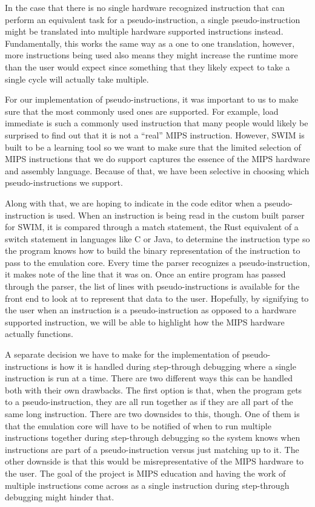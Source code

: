 \documentclass[parskip=half, fontsize=12pt]{scrartcl}
\begin{document}
In the case that there is no single hardware recognized instruction that
can perform an equivalent task for a pseudo-instruction, a single
pseudo-instruction might be translated into multiple hardware supported
instructions instead. Fundamentally, this works the same way as a one to
one translation, however, more instructions being used also means they
might increase the runtime more than the user would expect since
something that they likely expect to take a single cycle will actually
take multiple.

For our implementation of pseudo-instructions, it was important to us to
make sure that the most commonly used ones are supported. For example,
load immediate is such a commonly used instruction that many people
would likely be surprised to find out that it is not a ``real'' MIPS
instruction. However, SWIM is built to be a learning tool so we want to
make sure that the limited selection of MIPS instructions that we do
support captures the essence of the MIPS hardware and assembly language.
Because of that, we have been selective in choosing which
pseudo-instructions we support.

Along with that, we are hoping to indicate in the code editor when a
pseudo-instruction is used. When an instruction is being read in the
custom built parser for SWIM, it is compared through a match statement,
the Rust equivalent of a switch statement in languages like C or Java,
to determine the instruction type so the program knows how to build the
binary representation of the instruction to pass to the emulation core.
Every time the parser recognizes a pseudo-instruction, it makes note of
the line that it was on. Once an entire program has passed through the
parser, the list of lines with pseudo-instructions is available for the
front end to look at to represent that data to the user. Hopefully, by
signifying to the user when an instruction is a pseudo-instruction as
opposed to a hardware supported instruction, we will be able to
highlight how the MIPS hardware actually functions.

A separate decision we have to make for the implementation of
pseudo-instructions is how it is handled during step-through debugging
where a single instruction is run at a time. There are two different
ways this can be handled both with their own drawbacks. The first option
is that, when the program gets to a pseudo-instruction, they are all run
together as if they are all part of the same long instruction. There are
two downsides to this, though. One of them is that the emulation core
will have to be notified of when to run multiple instructions together
during step-through debugging so the system knows when instructions are
part of a pseudo-instruction versus just matching up to it. The other
downside is that this would be misrepresentative of the MIPS hardware to
the user. The goal of the project is MIPS education and having the work
of multiple instructions come across as a single instruction during
step-through debugging might hinder that.
\end{document}
